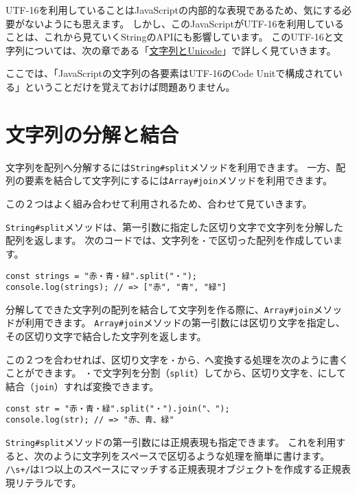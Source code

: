 UTF-16を利用していることはJavaScriptの内部的な表現であるため、気にする必要がないようにも思えます。
しかし、このJavaScriptがUTF-16を利用していることは、これから見ていくStringのAPIにも影響しています。
このUTF-16と文字列については、次の章である「\hyperlink{string-unicode}{文字列とUnicode}」で詳しく見ていきます。

ここでは、「JavaScriptの文字列の各要素はUTF-16のCode
Unitで構成されている」ということだけを覚えておけば問題ありません。

\hypertarget{split-join}{%
\section{文字列の分解と結合}\label{split-join}}

文字列を配列へ分解するには\texttt{String\#split}メソッドを利用できます。
一方、配列の要素を結合して文字列にするには\texttt{Array\#join}メソッドを利用できます。

この２つはよく組み合わせて利用されるため、合わせて見ていきます。

\texttt{String\#split}メソッドは、第一引数に指定した区切り文字で文字列を分解した配列を返します。
次のコードでは、文字列を\texttt{・}で区切った配列を作成しています。

\begin{lstlisting}
const strings = "赤・青・緑".split("・");
console.log(strings); // => ["赤", "青", "緑"]
\end{lstlisting}

分解してできた文字列の配列を結合して文字列を作る際に、\texttt{Array\#join}メソッドが利用できます。
\texttt{Array\#join}メソッドの第一引数には区切り文字を指定し、その区切り文字で結合した文字列を返します。

この２つを合わせれば、区切り文字を\texttt{・}から\texttt{、}へ変換する処理を次のように書くことができます。
\texttt{・}で文字列を分割（\texttt{split}）してから、区切り文字を\texttt{、}にして結合（\texttt{join}）すれば変換できます。

\begin{lstlisting}
const str = "赤・青・緑".split("・").join("、");
console.log(str); // => "赤、青、緑"
\end{lstlisting}

\texttt{String\#split}メソッドの第一引数には正規表現も指定できます。
これを利用すると、次のように文字列をスペースで区切るような処理を簡単に書けます。
\texttt{/\textbackslash s+/}は1つ以上のスペースにマッチする正規表現オブジェクトを作成する正規表現リテラルです。

